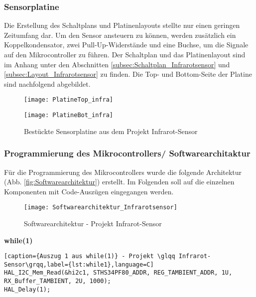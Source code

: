 \documentclass[
	letterpaper, %
	10pt, %
]{CSUniSchoolLabReport}
\begin{document}
\begin{spacing}{1.6}
\subsubsection{Sensorplatine}
Die Erstellung des Schaltplans und Platinenlayouts stellte nur einen geringen Zeitumfang dar. Um den Sensor ansteuern zu können, werden zusätzlich ein Koppelkondensator, zwei Pull-Up-Widerstände und eine Buchse, um die Signale auf den Mikrocontroller zu führen. Der Schaltplan und das Platinenlayout sind im Anhang unter den Abschnitten \ref{subsec:Schaltplan_Infrarotsensor} und \ref{subsec:Layout_Infrarotsensor} zu finden. Die Top- und Bottom-Seite der Platine sind nachfolgend abgebildet.\\
\begin{figure}[H]
    \begin{minipage}[t]{0.5\textwidth}
        \centering
        \texttt{[image: PlatineTop\_infra]}
    \end{minipage}
    \begin{minipage}[t]{0.5\textwidth}
        \centering
        \texttt{[image: PlatineBot\_infra]}
    \end{minipage}
        \caption{Bestückte Sensorplatine aus dem Projekt \glqq Infrarot-Sensor\grqq}
        \label{fig:Sensorplatine}
\end{figure}


\subsubsection{Programmierung des Mikrocontrollers/ Softwarearchitaktur}
Für die Programmierung des Mikrocontrollers wurde die folgende Architektur (Abb. \ref{fig:Softwarearchitektur}) erstellt. Im Folgenden soll auf die einzelnen Komponenten mit Code-Auszügen eingegangen werden.
\begin{figure}[H]
    \centering
    \texttt{[image: Softwarearchitektur\_Infrarotsensor]}
    \caption{Softwarearchitektur - Projekt \glqq Infrarot-Sensor\grqq}
    \label{fig:Softwarearchitektur_infrarot}
\end{figure}

\textbf{while(1)}
\begin{lstlisting}[caption={Auszug 1 aus while(1)} - Projekt \glqq Infrarot-Sensor\grqq,label={lst:while1},language=C]
HAL_I2C_Mem_Read(&hi2c1, STHS34PF80_ADDR, REG_TAMBIENT_ADDR, 1U, RX_Buffer_TAMBIENT, 2U, 1000);
HAL_Delay(1);


\end{lstlisting}
\end{spacing}
\end{document}
